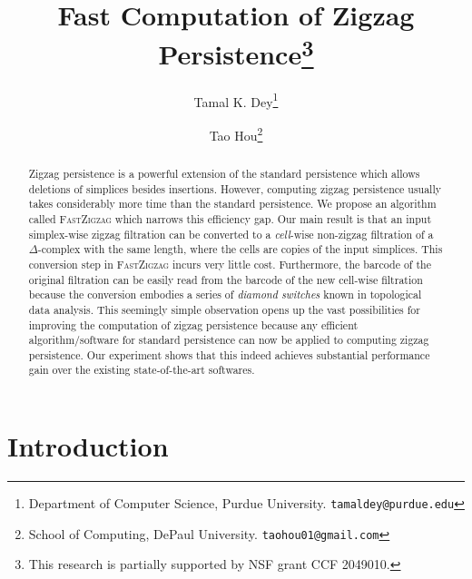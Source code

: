 \documentclass[letterpaper,11pt]{article}
\theoremstyle{mythmstyle}
\theoremstyle{mydefstyle}
\theoremstyle{plain}
\theoremstyle{definition}
\newcommand{\<}[1]{\langle #1\rangle}
\newcommand{\DG}{\Delta}
\begin{document}
\title{Fast Computation of Zigzag Persistence\thanks{This research is partially supported by NSF grant CCF 2049010.}}


\author{Tamal K. Dey\thanks{Department of Computer Science, Purdue University. \texttt{tamaldey@purdue.edu}}
\and Tao Hou\thanks{School of Computing, DePaul University. \texttt{taohou01@gmail.com}}
}

\date{}

\maketitle
\thispagestyle{empty}

\begin{abstract}
Zigzag persistence is a powerful extension of the standard persistence
which allows deletions of simplices besides
insertions.
However, 
computing
zigzag persistence usually takes considerably more time than the standard persistence.
We propose an algorithm called \textsc{FastZigzag} which
narrows this efficiency gap.
Our main result is that an input simplex-wise zigzag filtration can be
converted to a \emph{cell}-wise non-zigzag filtration of a {$\DG$-complex} 
with the same length,
where the cells are copies of the input simplices. This conversion
step in \textsc{FastZigzag} incurs very little cost. Furthermore, the barcode
of the original filtration can be easily read from the barcode of the
new cell-wise filtration
because the conversion embodies
a series of \emph{diamond switches} known in topological data analysis.
This seemingly simple observation
opens up the vast possibilities for improving the computation of zigzag persistence
because any efficient algorithm/software for standard persistence
can now be applied to computing
zigzag persistence.
Our experiment shows that
this indeed achieves substantial performance gain over the existing state-of-the-art softwares.
\end{abstract}

\newpage
\setcounter{page}{1}

\newcommand{\defemph}[1]{\emph{#1}}

\section{Introduction}
\end{document}
